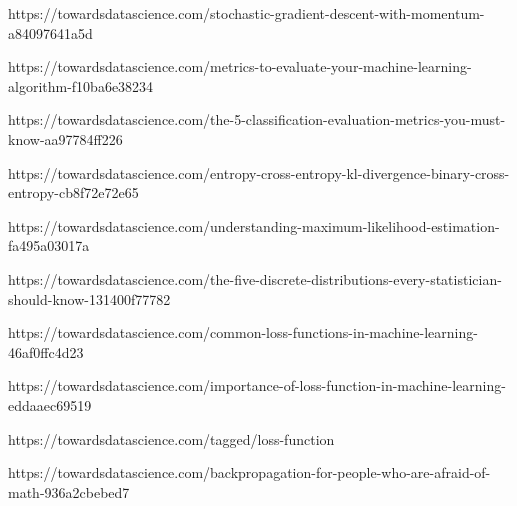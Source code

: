 https://towardsdatascience.com/stochastic-gradient-descent-with-momentum-a84097641a5d

https://towardsdatascience.com/metrics-to-evaluate-your-machine-learning-algorithm-f10ba6e38234

https://towardsdatascience.com/the-5-classification-evaluation-metrics-you-must-know-aa97784ff226

https://towardsdatascience.com/entropy-cross-entropy-kl-divergence-binary-cross-entropy-cb8f72e72e65

https://towardsdatascience.com/understanding-maximum-likelihood-estimation-fa495a03017a

https://towardsdatascience.com/the-five-discrete-distributions-every-statistician-should-know-131400f77782

https://towardsdatascience.com/common-loss-functions-in-machine-learning-46af0ffc4d23

https://towardsdatascience.com/importance-of-loss-function-in-machine-learning-eddaaec69519

https://towardsdatascience.com/tagged/loss-function

https://towardsdatascience.com/backpropagation-for-people-who-are-afraid-of-math-936a2cbebed7
%